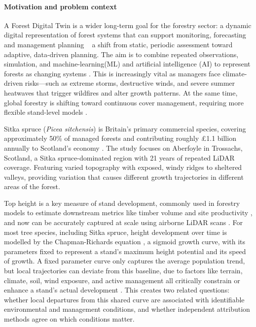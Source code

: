 \documentclass[logo,msc,ai]{infthesis}           %
\begin{document}
\paragraph*{Motivation and problem context}
A Forest Digital Twin is a wider long-term goal for the forestry sector: a dynamic digital representation of forest systems that can support monitoring, forecasting and management planning ~ a shift from static, periodic assessment toward adaptive, data-driven planning. The aim is to combine repeated observations, simulation, and machine-learning(ML) and artificial intelligence (AI) to represent forests as changing systems \cite{baskent2026Review_C1_SS, buonocore2022Proposal_C1_SS}. This is increasingly vital as managers face climate-driven risks—such as extreme storms, destructive winds, and severe summer heatwaves that trigger wildfires and alter growth patterns. At the same time, global forestry is shifting toward continuous cover management, requiring more flexible stand-level models \cite{ForestResearch2009Evidence_C1_SS}. 

Sitka spruce (\textit{Picea sitchensis}) is Britain's primary commercial species, covering approximately 50\% of managed forests \cite{ForestResearch2026Sitka_C1_SS} and contributing roughly \pounds1.1 billion annually to Scotland's economy \cite{ScottishForestry2026Future_C1_SS, mason2011Sitka_C1_SS}. The study focuses on Aberfoyle in Trossachs, Scotland, a Sitka spruce-dominated region with 21 years of repeated LiDAR coverage. Featuring varied topography with exposed, windy ridges to sheltered valleys, providing variation that causes different growth trajectories in different areas of the forest. 


Top height is a key measure of stand development, commonly used in forestry models to estimate downstream metrics like timber volume and site productivity \cite{ForestResearch2026Sitka_C1_SS}, and now can be accurately captured at scale using airborne LiDAR scans \cite{suarezminguez2008Practical_C1_SS}. For most tree species, including Sitka spruce, height development over time is modelled by the Chapman-Richards equation \cite{pommerening2015Methods_C2_CR}, a sigmoid growth curve, with its parameters fixed to represent a stand's maximum height potential and its speed of growth. A fixed parameter curve only captures the average population trend, but local trajectories can deviate from this baseline, due to factors like terrain, climate, soil, wind exposure, and active management all critically constrain or enhance a stand's actual development \cite{socha2023Higher_C1_SS, cameron2015Building_C1_SS}. This creates two related questions: whether local departures from this shared curve are associated with identifiable environmental and management conditions, and whether independent attribution methods agree on which conditions matter.
\end{document}
